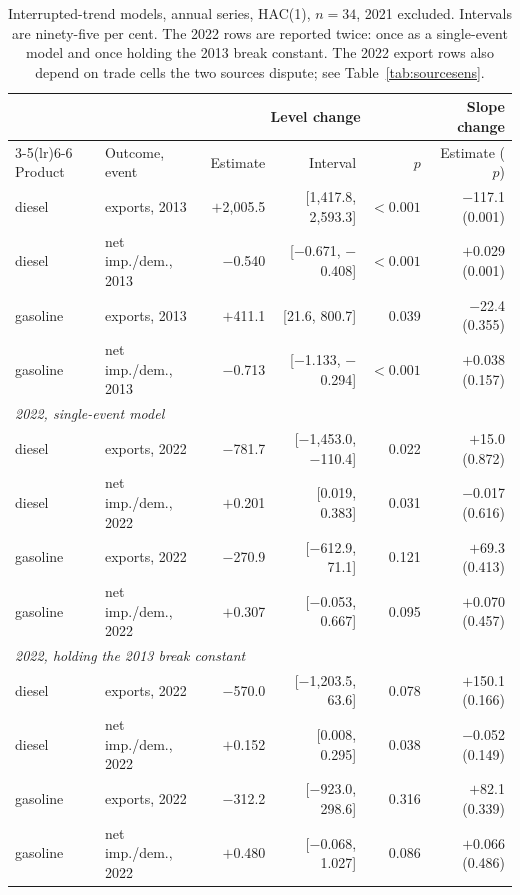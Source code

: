 \documentclass[11pt,a4paper]{article}
\begin{document}
\begin{table}[htbp]
\centering
\caption{Interrupted-trend models, annual series, HAC(1), $n=34$, 2021 excluded. Intervals are ninety-five per
cent. The 2022 rows are reported twice: once as a single-event model and once holding
the 2013 break constant. The 2022 export rows also depend on trade cells the two sources
dispute; see Table~\ref{tab:sourcesens}.}
\label{tab:its}
\small
\begin{tabular}{llrrrr}
\toprule
& & \multicolumn{3}{c}{Level change} & Slope change \\
\cmidrule(lr){3-5}\cmidrule(lr){6-6}
Product & Outcome, event & Estimate & Interval & $p$ & Estimate ($p$) \\
\midrule
diesel & exports, 2013 & $+$2{,}005.5 & [1{,}417.8, 2{,}593.3] & $<0.001$ & $-$117.1 (0.001) \\
diesel & net imp./dem., 2013 & $-$0.540 & [$-$0.671, $-$0.408] & $<0.001$ & $+$0.029 (0.001) \\
gasoline & exports, 2013 & $+$411.1 & [21.6, 800.7] & 0.039 & $-$22.4 (0.355) \\
gasoline & net imp./dem., 2013 & $-$0.713 & [$-$1.133, $-$0.294] & $<0.001$ & $+$0.038 (0.157) \\
\midrule
\multicolumn{6}{l}{\emph{2022, single-event model}} \\
diesel & exports, 2022 & $-$781.7 & [$-$1{,}453.0, $-$110.4] & 0.022 & $+$15.0 (0.872) \\
diesel & net imp./dem., 2022 & $+$0.201 & [0.019, 0.383] & 0.031 & $-$0.017 (0.616) \\
gasoline & exports, 2022 & $-$270.9 & [$-$612.9, 71.1] & 0.121 & $+$69.3 (0.413) \\
gasoline & net imp./dem., 2022 & $+$0.307 & [$-$0.053, 0.667] & 0.095 & $+$0.070 (0.457) \\
\midrule
\multicolumn{6}{l}{\emph{2022, holding the 2013 break constant}} \\
diesel & exports, 2022 & $-$570.0 & [$-$1{,}203.5, 63.6] & 0.078 & $+$150.1 (0.166) \\
diesel & net imp./dem., 2022 & $+$0.152 & [0.008, 0.295] & 0.038 & $-$0.052 (0.149) \\
gasoline & exports, 2022 & $-$312.2 & [$-$923.0, 298.6] & 0.316 & $+$82.1 (0.339) \\
gasoline & net imp./dem., 2022 & $+$0.480 & [$-$0.068, 1.027] & 0.086 & $+$0.066 (0.486) \\
\bottomrule
\end{tabular}
\end{table}
\end{document}
